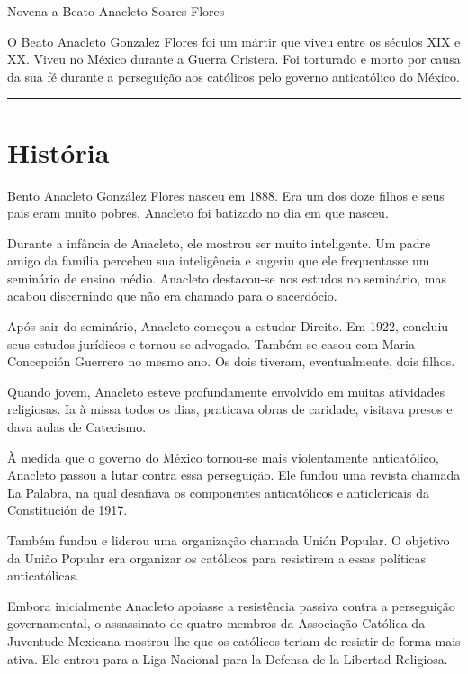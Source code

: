 \documentclass[a4paper,14pt,twoside]{extarticle} \usepackage[utf8]{inputenc}
\begin{document}
\begin{center}
  {\huge Novena a Beato Anacleto Soares Flores}
\end{center}

O Beato Anacleto Gonzalez Flores foi um mártir que viveu entre os séculos XIX e XX. Viveu no México durante a Guerra Cristera. Foi torturado e morto por causa da sua fé durante a perseguição aos católicos pelo governo anticatólico do México.

{\centering \rule{1.0\textwidth}{0.4pt}}

\tableofcontents
\thispagestyle{empty}


\newpage
\section{História}

Bento Anacleto González Flores nasceu em 1888. Era um dos doze filhos e seus pais eram muito pobres. Anacleto foi batizado no dia em que nasceu.

Durante a infância de Anacleto, ele mostrou ser muito inteligente. Um padre amigo da família percebeu sua inteligência e sugeriu que ele frequentasse um seminário de ensino médio. Anacleto destacou-se nos estudos no seminário, mas acabou discernindo que não era chamado para o sacerdócio.

Após sair do seminário, Anacleto começou a estudar Direito. Em 1922, concluiu seus estudos jurídicos e tornou-se advogado. Também se casou com Maria Concepción Guerrero no mesmo ano. Os dois tiveram, eventualmente, dois filhos.

Quando jovem, Anacleto esteve profundamente envolvido em muitas atividades religiosas. Ia à missa todos os dias, praticava obras de caridade, visitava presos e dava aulas de Catecismo.

À medida que o governo do México tornou-se mais violentamente anticatólico, Anacleto passou a lutar contra essa perseguição. Ele fundou uma revista chamada La Palabra, na qual desafiava os componentes anticatólicos e anticlericais da Constitución de 1917.

Também fundou e liderou uma organização chamada Unión Popular. O objetivo da União Popular era organizar os católicos para resistirem a essas políticas anticatólicas.

Embora inicialmente Anacleto apoiasse a resistência passiva contra a perseguição governamental, o assassinato de quatro membros da Associação Católica da Juventude Mexicana mostrou-lhe que os católicos teriam de resistir de forma mais ativa. Ele entrou para a Liga Nacional para la Defensa de la Libertad Religiosa.
\end{document}
